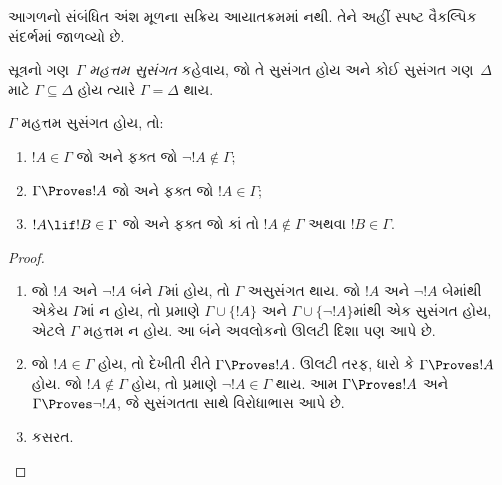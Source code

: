 \OLEndChapterHook


\begin{editorial}
આગળનો સંબંધિત અંશ મૂળના સક્રિય આયાતક્રમમાં નથી. તેને અહીં સ્પષ્ટ વૈકલ્પિક સંદર્ભમાં જાળવ્યો છે.
\end{editorial}
\begingroup
\makeatletter{}\makeatother


\label{guunit:OLP-0714}


\begin{defn}
સૂત્રનો ગણ~$\Gamma$ \emph{મહત્તમ સુસંગત} કહેવાય,
જો તે સુસંગત હોય અને કોઈ સુસંગત ગણ~$\Delta$ માટે
$\Gamma \subseteq \Delta$ હોય ત્યારે $\Gamma = \Delta$ થાય.
\end{defn}

\begin{lem}[સત્ય સહાયક પ્રમેય]
$\Gamma$ મહત્તમ સુસંગત હોય, તો:
\begin{enumerate}
\item {} $!A \in \Gamma$ જો અને ફક્ત જો
  $\lnot !A \notin \Gamma$;
\item {} $\Gamma \Proves !A$ જો અને ફક્ત જો
  $!A \in \Gamma$;
\item {} $!A \lif !B \in \Gamma$ જો અને ફક્ત જો
  કાં તો $!A \notin \Gamma$ અથવા $!B \in \Gamma$.
\end{enumerate}
\end{lem}

\begin{proof}
\begin{enumerate}
\item જો $!A$ અને $\lnot !A$ બંને $\Gamma$માં હોય,
  તો $\Gamma$ અસુસંગત થાય. જો $!A$ અને $\lnot!A$ બેમાંથી એકેય
  $\Gamma$માં ન હોય, તો
   પ્રમાણે
  $\Gamma\cup\{!A\}$ અને $\Gamma \cup \{\lnot !A\}$માંથી
  એક સુસંગત હોય, એટલે $\Gamma$ મહત્તમ ન હોય.
  આ બંને અવલોકનો ઊલટી દિશા પણ આપે છે.
\item જો $!A \in \Gamma$ હોય, તો દેખીતી રીતે $\Gamma \Proves !A$.
  ઊલટી તરફ, ધારો કે $\Gamma \Proves !A$ હોય.
  જો $!A \notin \Gamma$ હોય, તો 
  પ્રમાણે $\lnot !A \in \Gamma$ થાય.
  આમ $\Gamma \Proves !A$ અને $\Gamma \Proves \lnot !A$,
  જે સુસંગતતા સાથે વિરોધાભાસ આપે છે.
\item કસરત.
\end{enumerate}
\end{proof}


